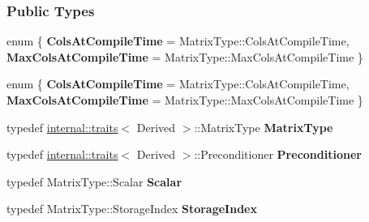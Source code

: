 \subsubsection*{Public Types}
\begin{DoxyCompactItemize}
\item 
\mbox{\label{group___iterative_linear_solvers___module_a64c91ad10d958a4dc393633958aeb7ae}} 
enum \{ {\bfseries Cols\+At\+Compile\+Time} = Matrix\+Type\+:\+:Cols\+At\+Compile\+Time, 
{\bfseries Max\+Cols\+At\+Compile\+Time} = Matrix\+Type\+:\+:Max\+Cols\+At\+Compile\+Time
 \}
\item 
\mbox{\label{group___iterative_linear_solvers___module_ad025aef29c5dbe7eaffc3f35db62287a}} 
enum \{ {\bfseries Cols\+At\+Compile\+Time} = Matrix\+Type\+:\+:Cols\+At\+Compile\+Time, 
{\bfseries Max\+Cols\+At\+Compile\+Time} = Matrix\+Type\+:\+:Max\+Cols\+At\+Compile\+Time
 \}
\item 
\mbox{\label{group___iterative_linear_solvers___module_a1df877cce514c709a0333592c25d4465}} 
typedef \hyperlink{struct_eigen_1_1internal_1_1traits}{internal\+::traits}$<$ Derived $>$\+::Matrix\+Type {\bfseries Matrix\+Type}
\item 
\mbox{\label{group___iterative_linear_solvers___module_a72269c01d2c2a7309ef64724add2bd57}} 
typedef \hyperlink{struct_eigen_1_1internal_1_1traits}{internal\+::traits}$<$ Derived $>$\+::Preconditioner {\bfseries Preconditioner}
\item 
\mbox{\label{group___iterative_linear_solvers___module_a6394965cb238cfd9dcde422a7d483d49}} 
typedef Matrix\+Type\+::\+Scalar {\bfseries Scalar}
\item 
\mbox{\label{group___iterative_linear_solvers___module_a9c6e7fa7de26b1608d35c75a5eb6370c}} 
typedef Matrix\+Type\+::\+Storage\+Index {\bfseries Storage\+Index}
\item 
\mbox{\label{group___iterative_linear_solvers___module_a4d87eef9d6728d2e366c20fd9adf2140}} 

\end{DoxyCompactItemize}
